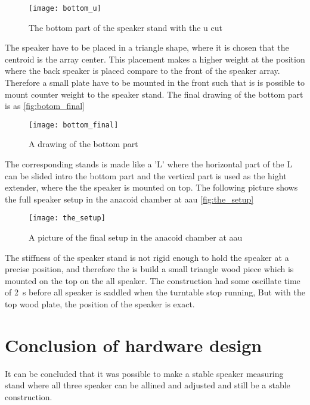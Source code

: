  \begin{figure}[H]
	\centering
	\texttt{[image: bottom\_u]}
	\caption{The bottom part of the speaker stand with the u cut}
		\label{fig:botom_u}
\end{figure}

The speaker have to be placed in a triangle shape, where it is chosen that the centroid is the array center. This placement makes a higher weight at the position where the back speaker is placed compare to the front of the speaker array. Therefore a small plate have to be mounted in the front such that is is possible to mount counter weight to the speaker stand. The final drawing of the bottom part is as \autoref{fig:botom_final}

  \begin{figure}[H]
	\centering
	\texttt{[image: bottom\_final]}
	\caption{A drawing of the bottom part}
		\label{fig:botom_final}
\end{figure}

The corresponding stands is made like a 'L' where the horizontal part of the L can be slided intro the bottom part and the vertical part is used as the hight extender, where the the speaker is mounted on top. The following picture shows the full speaker setup in the anacoid chamber at \gls{aau} \autoref{fig:the_setup}

  \begin{figure}[H]
	\centering
	\texttt{[image: the\_setup]}
	\caption{A picture of the final setup in the anacoid chamber at \gls{aau}}
		\label{fig:the_setup}
\end{figure}

The stiffness of the speaker stand is not rigid enough to hold the speaker at a precise position, and therefore the is build a small triangle wood piece which is mounted on the top on the all speaker. The construction had some oscillate time of \SI{2}{\second} before all speaker is saddled when the turntable stop running, But with the top wood plate, the position of the speaker is exact. 

\section{Conclusion of hardware design}

It can be concluded that it was possible to make a stable speaker measuring stand where all three speaker can be allined and adjusted and still be a stable construction.




